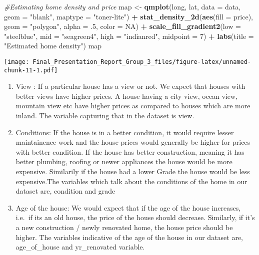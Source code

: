 \documentclass[
]{article}
\newenvironment{Shaded}{\begin{snugshade}}{\end{snugshade}}
\newcommand{\CommentTok}[1]{\textcolor[rgb]{0.56,0.35,0.01}{\textit{#1}}}
\newcommand{\DataTypeTok}[1]{\textcolor[rgb]{0.13,0.29,0.53}{#1}}
\newcommand{\DecValTok}[1]{\textcolor[rgb]{0.00,0.00,0.81}{#1}}
\newcommand{\FloatTok}[1]{\textcolor[rgb]{0.00,0.00,0.81}{#1}}
\newcommand{\KeywordTok}[1]{\textcolor[rgb]{0.13,0.29,0.53}{\textbf{#1}}}
\newcommand{\NormalTok}[1]{#1}
\newcommand{\OperatorTok}[1]{\textcolor[rgb]{0.81,0.36,0.00}{\textbf{#1}}}
\newcommand{\OtherTok}[1]{\textcolor[rgb]{0.56,0.35,0.01}{#1}}
\newcommand{\StringTok}[1]{\textcolor[rgb]{0.31,0.60,0.02}{#1}}
\begin{document}
\begin{Shaded}
\begin{Highlighting}[]
\CommentTok{#Estimating home density and price}
\NormalTok{map <-}\StringTok{ }\KeywordTok{qmplot}\NormalTok{(long, lat, }\DataTypeTok{data =}\NormalTok{ data, }\DataTypeTok{geom =} \StringTok{"blank"}\NormalTok{,}
       \DataTypeTok{maptype =} \StringTok{"toner-lite"}\NormalTok{) }\OperatorTok{+}
\StringTok{  }\KeywordTok{stat_density_2d}\NormalTok{(}\KeywordTok{aes}\NormalTok{(}\DataTypeTok{fill =}\NormalTok{ price), }
                  \DataTypeTok{geom =} \StringTok{"polygon"}\NormalTok{, }\DataTypeTok{alpha =} \FloatTok{.5}\NormalTok{, }\DataTypeTok{color =} \OtherTok{NA}\NormalTok{) }\OperatorTok{+}
\StringTok{  }\KeywordTok{scale_fill_gradient2}\NormalTok{(}\DataTypeTok{low =} \StringTok{"steelblue"}\NormalTok{, }\DataTypeTok{mid =} \StringTok{"seagreen4"}\NormalTok{, }
                        \DataTypeTok{high =} \StringTok{"indianred"}\NormalTok{, }\DataTypeTok{midpoint =} \DecValTok{7}\NormalTok{) }\OperatorTok{+}
\StringTok{  }\KeywordTok{labs}\NormalTok{(}\DataTypeTok{title =} \StringTok{"Estimated home density"}\NormalTok{)}
\NormalTok{map}
\end{Highlighting}
\end{Shaded}

\texttt{[image: Final\_Presentation\_Report\_Group\_3\_files/figure-latex/unnamed-chunk-11-1.pdf]}

\begin{enumerate}
\def\labelenumi{\arabic{enumi}.}
\setcounter{enumi}{2}
\item
  View : If a particular house has a view or not. We expect that houses
  with better views have higher prices. A house having a city view,
  ocean view, mountain view etc have higher prices as compared to houses
  which are more inland. The variable capturing that in the dataset is
  view.
\item
  Conditions: If the house is in a better condition, it would require
  lesser maintainence work and the house prices would generally be
  higher for prices with better condition. If the house has better
  construction, meaning it has better plumbing, roofing or newer
  appliances the house would be more expensive. Similarily if the house
  had a lower Grade the house would be less expensive.The variables
  which talk about the conditions of the home in our dataset are,
  condition and grade
\item
  Age of the house: We would expect that if the age of the house
  increases, i.e.~if its an old house, the price of the house should
  decrease. Similarly, if it's a new construction / newly renovated
  home, the house price should be higher. The variables indicative of
  the age of the house in our dataset are, age\_of\_house and
  yr\_renovated variable.
\end{enumerate}
\end{document}
